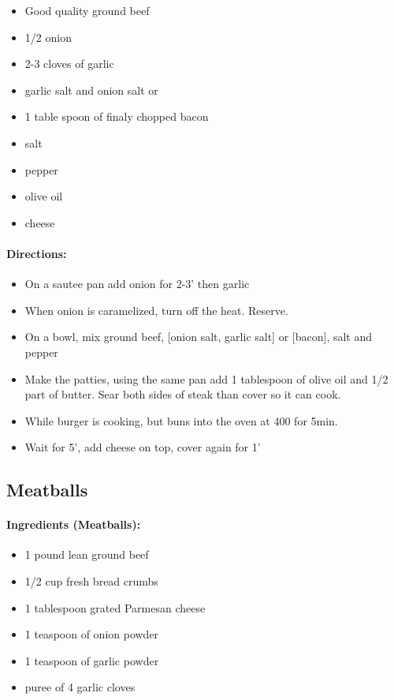 \documentclass{article}
\begin{document}
\begin{itemize}
	\item Good quality ground beef
	\item 1/2 onion
	\item 2-3 cloves of garlic
	\item garlic salt and onion salt or
	\item 1 table spoon of finaly chopped bacon
	\item salt
	\item pepper
	\item olive oil
	\item cheese
\end{itemize}

\paragraph{Directions:}
\begin{itemize}
	\item On a sautee pan add onion for 2-3' then garlic
	\item When onion is caramelized, turn off the heat. Reserve.
	\item On a bowl, mix ground beef, [onion salt, garlic salt] or [bacon], salt and pepper
	\item Make the patties, using the same pan add 1 tablespoon of olive oil and 1/2 part of butter. Sear both sides of steak than cover so it can cook.
	\item While burger is cooking, but buns into the oven at 400 for 5min.
	\item Wait for 5', add cheese on top, cover again for 1'
\end{itemize} 

\subsection{Meatballs}

\paragraph{Ingredients (Meatballs):}

\begin{itemize}
	\item 1 pound lean ground beef 
	\item 1/2 cup fresh bread crumbs 
	\item 1 tablespoon grated Parmesan cheese 
	\item 1 teaspoon of onion powder
	\item 1 teaspoon of garlic powder
	\item puree of 4 garlic cloves 
\end{itemize}
\end{document}
